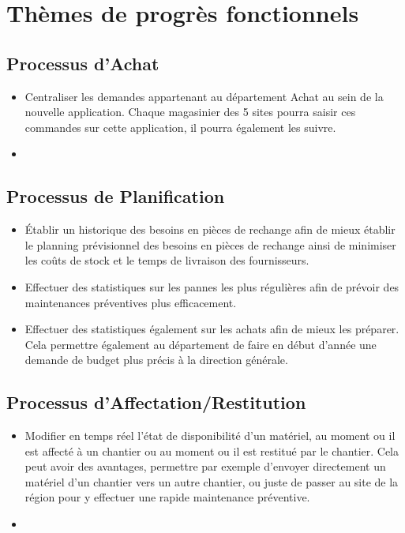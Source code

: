 \section{Thèmes de progrès fonctionnels}
        \subsection{Processus d'Achat}
        \begin{itemize}
                \item Centraliser les demandes appartenant au département Achat au sein de la nouvelle application. Chaque magasinier des 5 sites pourra saisir ces commandes sur cette application, il pourra également les suivre.
                \item 
        \end{itemize}

        \subsection{Processus de Planification}
        \begin{itemize}
                \item Établir un historique des besoins en pièces de rechange afin de mieux établir le planning prévisionnel des besoins en pièces de rechange ainsi de minimiser les coûts de stock et le temps de livraison des fournisseurs.
                \item Effectuer des statistiques sur les pannes les plus régulières afin de prévoir des maintenances préventives plus efficacement.
                \item Effectuer des statistiques également sur les achats afin de mieux les préparer. Cela permettre également au département de faire en début d'année une demande de budget plus précis à la direction générale.
        \end{itemize}

        \subsection{Processus d'Affectation/Restitution}
        \begin{itemize}
                \item Modifier en temps réel l'état de disponibilité d'un matériel, au moment ou il est affecté à un chantier ou au moment ou il est restitué par le chantier. Cela peut avoir des avantages, permettre par exemple d'envoyer directement un matériel d'un chantier vers un autre chantier, ou juste de passer au site de la région pour y effectuer une rapide maintenance préventive.
                \item 
        \end{itemize}

